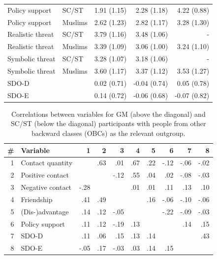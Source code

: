 \documentclass[12pt, a4paper]{article}
\begin{document}
\begin{table}[!hp]
\begin{tabular}{llrrr}
  Policy support & SC/ST & 1.91 (1.15) & 2.28 (1.18) & 4.22 (0.88) \\ 
  Policy support & Muslims & 2.62 (1.23) & 2.82 (1.17) & 3.28 (1.30) \\ \addlinespace
  Realistic threat & SC/ST & 3.79 (1.16) & 3.48 (1.06) & - \\ 
  Realistic threat & Muslims & 3.39 (1.09) & 3.06 (1.00) & 3.24 (1.10) \\ \addlinespace
  Symbolic threat & SC/ST & 3.28 (1.07) & 3.18 (1.06) & - \\ 
  Symbolic threat & Muslims & 3.60 (1.17) & 3.37 (1.12) & 3.53 (1.27) \\ \addlinespace
  SDO-D &  & 0.02 (0.71) & -0.04 (0.74) & 0.05 (0.78) \\ 
  SDO-E &  & 0.14 (0.72) & -0.06 (0.68) & -0.07 (0.82) \\  \bottomrule
\end{tabular}
\label{tab:b-1}
\end{table}


\begin{table}[!hp]
\centering
{}
\caption{Correlations between variables for GM (above the diagonal) and SC/ST (below the diagonal) participants with people from other backward classes (OBCs) as the relevant outgroup.}
\small	
\begin{tabular}{rlrrrrrrrr} \toprule
\# & Variable & 1 & 2 & 3 & 4 & 5 & 6 & 7 & 8 \\ \midrule 
1 & Contact quantity &  &  .63 &  .01 &  .67 &  .22 & -.12 & -.06 & -.02 \\ 
  2 & Positive contact &  &  & -.12 &  .55 &  .04 &  .02 & -.08 & -.03 \\ 
  3 & Negative contact & -.28 &  &  &  .01 &  .01 &  .11 &  .13 &  .10 \\ 
  4 & Friendship &  .41 &  .49 &  &  &  .16 & -.06 & -.10 & -.06 \\ 
  5 & (Dis-)advantage &  .14 &  .12 & -.05 &  &  & -.22 & -.09 & -.03 \\ 
  6 & Policy support &  .11 &  .12 & -.19 &  .13 &  &  &  .14 &  .15 \\ 
  7 & SDO-D &  .11 &  .06 &  .15 &  .13 &  .14 &  &  &  .43 \\ 
  8 & SDO-E & -.05 &  .17 & -.03 &  .03 &  .14 &  .15 &  &  \\ 
\bottomrule
\end{tabular}
\label{tab:b-2}
\end{table}
\end{document}
